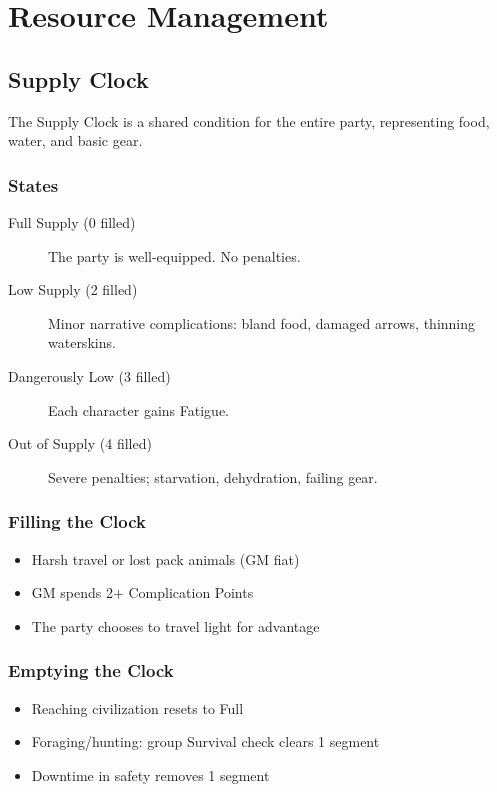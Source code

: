 \chapter{Resource Management}

\section{Supply Clock}

The Supply Clock is a shared condition for the entire party, representing food, water, and basic gear.

\subsection{States}

\begin{description}
\item[Full Supply (0 filled)] The party is well-equipped. No penalties.
\item[Low Supply (2 filled)] Minor narrative complications: bland food, damaged arrows, thinning waterskins.
\item[Dangerously Low (3 filled)] Each character gains Fatigue.
\item[Out of Supply (4 filled)] Severe penalties; starvation, dehydration, failing gear.
\end{description}

\subsection{Filling the Clock}

\begin{itemize}
\item Harsh travel or lost pack animals (GM fiat)
\item GM spends 2+ Complication Points
\item The party chooses to travel light for advantage
\end{itemize}

\subsection{Emptying the Clock}

\begin{itemize}
\item Reaching civilization resets to Full
\item Foraging/hunting: group Survival check clears 1 segment
\item Downtime in safety removes 1 segment
\end{itemize}

